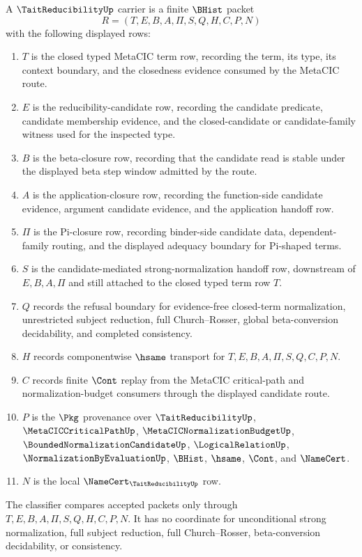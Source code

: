 \begin{definition}
\label{def:tait-reducibility-carrier}
A $\TaitReducibilityUp$ carrier is a finite $\BHist$ packet
$$
R=(T,E,B,A,\Pi,S,Q,H,C,P,N)
$$
with the following displayed rows:
\begin{enumerate}
\item $T$ is the closed typed MetaCIC term row, recording the term, its type, its context boundary, and the closedness evidence consumed by the MetaCIC route.
\item $E$ is the reducibility-candidate row, recording the candidate predicate, candidate membership evidence, and the closed-candidate or candidate-family witness used for the inspected type.
\item $B$ is the beta-closure row, recording that the candidate read is stable under the displayed beta step window admitted by the route.
\item $A$ is the application-closure row, recording the function-side candidate evidence, argument candidate evidence, and the application handoff row.
\item $\Pi$ is the Pi-closure row, recording binder-side candidate data, dependent-family routing, and the displayed adequacy boundary for Pi-shaped terms.
\item $S$ is the candidate-mediated strong-normalization handoff row, downstream of $E,B,A,\Pi$ and still attached to the closed typed term row $T$.
\item $Q$ records the refusal boundary for evidence-free closed-term normalization, unrestricted subject reduction, full Church--Rosser, global beta-conversion decidability, and completed consistency.
\item $H$ records componentwise $\hsame$ transport for $T,E,B,A,\Pi,S,Q,C,P,N$.
\item $C$ records finite $\Cont$ replay from the MetaCIC critical-path and normalization-budget consumers through the displayed candidate route.
\item $P$ is the $\Pkg$ provenance over $\TaitReducibilityUp$, $\MetaCICCriticalPathUp$, $\MetaCICNormalizationBudgetUp$, $\BoundedNormalizationCandidateUp$, $\LogicalRelationUp$, $\NormalizationByEvaluationUp$, $\BHist$, $\hsame$, $\Cont$, and $\NameCert$.
\item $N$ is the local $\NameCert_{\TaitReducibilityUp}$ row.
\end{enumerate}
The classifier compares accepted packets only through $T,E,B,A,\Pi,S,Q,H,C,P,N$. It has no coordinate for unconditional strong normalization, full subject reduction, full Church--Rosser, beta-conversion decidability, or consistency.
\end{definition}

